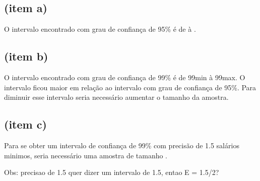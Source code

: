 \subsection{(item a)}
O intervalo encontrado com grau de confiança de 95\% é de \TRESicmin à \TRESicmax.

\subsection{(item b)}
O intervalo encontrado com grau de confiança de 99\% é de \TRESic99min à \TRESic99max.
O intervalo ficou maior em relação ao intervalo com grau de confiança de 95\%.{}
Para diminuir esse intervalo seria necessário aumentar o tamanho da amostra.

\subsection{(item c)}
Para se obter um intervalo de confiança de 99\% com precisão de 1.5 salários
minimos, seria necessário uma amostra de tamanho .

Obs: precisao de 1.5 quer dizer um intervalo de 1.5, entao E = 1.5/2?
